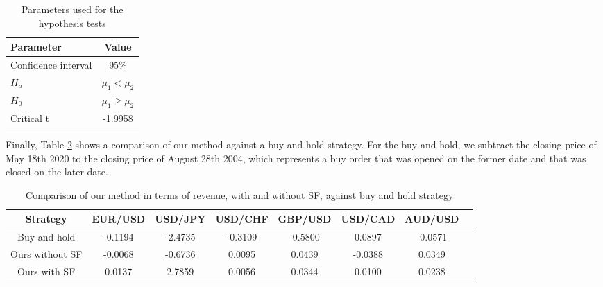 \documentclass{ieeeaccess}
\begin{document}
\begin{table}[]
  \caption{Parameters used for the hypothesis tests}
  \small
  \centering
  \begin{tabular}{lc}
    \textbf{Parameter} & \textbf{Value} \\
    \hline
    Confidence interval & 95\% \\
    $H_a$ & $\mu_1 < \mu_2$ \\
    $H_0$ & $\mu_1 \geq \mu_2$ \\
    Critical t & -1.9958 \\
  \end{tabular}
  \label{table:parameters-tests}
\end{table}


Finally, Table \ref{table:results-buy-and-hold} shows a comparison of
our method against a buy and hold strategy. For the buy and hold, we
subtract the closing price of May 18th 2020 to the closing price of
August 28th 2004, which represents a buy order that was opened on the
former date and that was closed on the later date.

\begin{table}[t]
  \caption{Comparison of our method in terms of revenue, with and without SF, against buy and hold strategy}
  \scriptsize
  \centering
  \begin{tabular*}{0.9\textwidth}{c @{\extracolsep{\fill}} ccccccc}
    \hline
    \textbf{Strategy} & \textbf{EUR/USD} & \textbf{USD/JPY} & \textbf{USD/CHF} & \textbf{GBP/USD} & \textbf{USD/CAD} & \textbf{AUD/USD} \\
    \hline

    Buy and hold        & -0.1194         & -2.4735         & -0.3109         & -0.5800         & 0.0897          & -0.0571 \\
    \hline
    Ours without SF     & -0.0068         & -0.6736         & 0.0095          & 0.0439          & -0.0388         & 0.0349 \\
    \hline
    Ours with SF        & 0.0137          & 2.7859          & 0.0056          & 0.0344          & 0.0100          & 0.0238 \\
    \hline
    
  \end{tabular*}
  \label{table:results-buy-and-hold}
\end{table}
\end{document}
